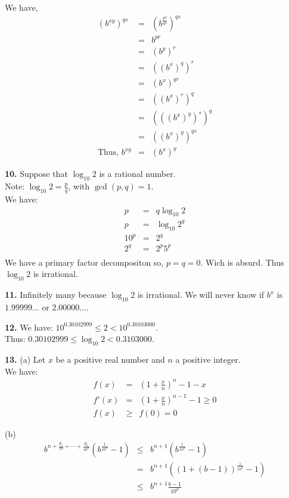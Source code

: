 \documentclass[a4paper,12pt]{article}
\newcommand{\newpar}[1]{\bigskip \noindent \textbf{#1.}}
\begin{document}
We have,
\begin{eqnarray*}
(b^{xy})^{qs} & = & (b^{\frac{pr}{qs}})^{qs}\\
& = & b^{pr}\\
& = & (b^p)^r\\
& = & ((b^x)^q)^r\\
& = & (b^x)^{qr}\\
& = & ((b^x)^r)^q\\
& = & (((b^x)^y)^s)^q\\
& = & ((b^x)^y)^{qs}\\
\mbox{Thus, }b^{xy} & = & (b^x)^y
\end{eqnarray*}

\newpar{10} Suppose that $\log_{10}2$ is a rational number.\\
Note: $\log_{10}2 = \frac{p}{q}$, with $\gcd(p, q) = 1$.\\
We have:
\begin{eqnarray*}
p &=& q \log_{10}2\\
p &=& \log_{10}2^q\\
10^p &=& 2^q\\
2^q &=& 2^p 5^p\\
\end{eqnarray*}
We have a primary factor decompositon so, $p = q = 0$. Wich is absurd.
Thus $\log_{10}2$ is irrational.

\newpar{11} Infinitely many because $\log_{10}2$ is irrational.  We will
never know if $b^x$ is $1.99999\ldots$ or $2.00000\ldots$.

\newpar{12} We have: $10^{0.30102999} \le 2 < 10^{0.30103000}$.\\
Thus: $0.30102999 \le \log_{10}2 < 0.3103000$.

\newpar{13} (a) Let $x$ be a positive real number and $n$ a positive integer.\\
We have:
\begin{eqnarray*}
f(x) &=& \left(1+\frac{x}{n}\right)^n - 1 - x\\
f'(x) &=& \left(1+\frac{x}{n}\right)^{n-1} - 1 \ge 0\\
f(x) &\ge& f(0) = 0
\end{eqnarray*}

\medskip
(b)
\begin{eqnarray*}
b^{n+\frac{d_1}{10}+\cdots+\frac{d_k}{10^k}}(b^{\frac{1}{10^k}}-1) & \le &
b^{n+1}(b^{\frac{1}{10^k}} - 1)\\ &=&
b^{n+1}((1 + (b-1))^{\frac{1}{10^k}} - 1)\\ & \le &
b^{n+1}\frac{b-1}{10^k}
\end{eqnarray*}
\end{document}
